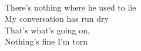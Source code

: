 \\
There's nothing where he used to lie\\
My conversation has run dry \\
That's what's going on, \\
Nothing's fine I'm torn \\
\\
